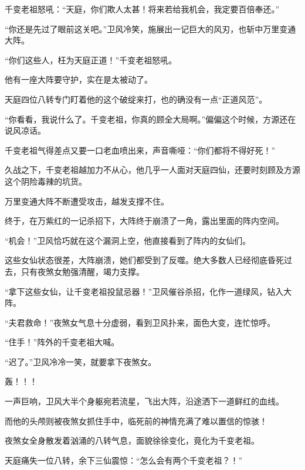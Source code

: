 \begin{this_body}
千变老祖怒吼：“天庭，你们欺人太甚！将来若给我机会，我定要百倍奉还。”

“你还是先过了眼前这关吧。”卫风冷笑，施展出一记巨大的风刃，也斩中万里变通大阵。

“你们这些人，枉为天庭正道！”千变老祖怒吼。

他有一座大阵要守护，实在是太被动了。

天庭四位八转专门盯着他的这个破绽来打，也的确没有一点“正道风范”。

“你看看，我说什么了。千变老祖，你真的顾全大局啊。”偏偏这个时候，方源还在说风凉话。

千变老祖气得差点又要一口老血喷出来，声音嘶哑：“你们都将不得好死！”

久战之下，千变老祖越加力不从心，他几乎一人面对天庭四仙，还要时刻顾及方源这个阴险毒辣的坑货。

万里变通大阵不断遭受攻击，越发支撑不住。

终于，在万紫红的一记杀招下，大阵终于崩溃了一角，露出里面的阵内空间。

“机会！”卫风恰巧就在这个漏洞上空，他直接看到了阵内的女仙们。

这些女仙状态很差，大阵崩溃，她们都受到了反噬。绝大多数人已经彻底昏死过去，只有夜煞女勉强清醒，竭力支撑。

“拿下这些女仙，让千变老祖投鼠忌器！”卫风催谷杀招，化作一道绿风，钻入大阵。

“夫君救命！”夜煞女气息十分虚弱，看到卫风扑来，面色大变，连忙惊呼。

“住手！”阵外的千变老祖大喊。

“迟了。”卫风冷冷一笑，就要拿下夜煞女。

轰！！！

一声巨响，卫风大半个身躯宛若流星，飞出大阵，沿途洒下一道鲜红的血线。

而他的头颅则被夜煞女抓住手中，临死前的神情充满了难以置信的惊骇！

夜煞女全身散发着汹涌的八转气息，面貌徐徐变化，竟化为千变老祖。

天庭痛失一位八转，余下三仙震惊：“怎么会有两个千变老祖？！”

\end{this_body}

